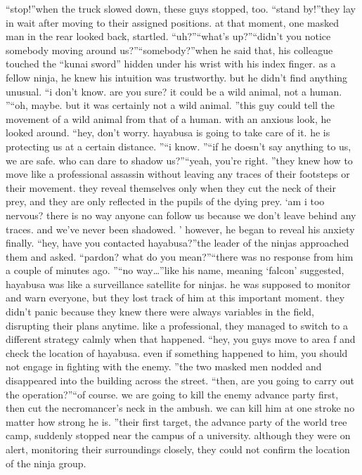 “stop!”when the truck slowed down, these guys stopped, too.
“stand by!”they lay in wait after moving to their assigned positions.
at that moment, one masked man in the rear looked back, startled.
“uh?”“what’s up?”“didn’t you notice somebody moving around us?”“somebody?”when he said that, his colleague touched the “kunai sword” hidden under his wrist with his index finger.
 as a fellow ninja, he knew his intuition was trustworthy.
 but he didn’t find anything unusual.
“i don’t know.
 are you sure? it could be a wild animal, not a human.
”“oh, maybe.
 but it was certainly not a wild animal.
”this guy could tell the movement of a wild animal from that of a human.
with an anxious look, he looked around.
“hey, don’t worry.
 hayabusa is going to take care of it.
 he is protecting us at a certain distance.
”“i know.
”“if he doesn’t say anything to us, we are safe.
 who can dare to shadow us?”“yeah, you’re right.
”they knew how to move like a professional assassin without leaving any traces of their footsteps or their movement.
they reveal themselves only when they cut the neck of their prey, and they are only reflected in the pupils of the dying prey.
‘am i too nervous? there is no way anyone can follow us because we don’t leave behind any traces.
 and we’ve never been shadowed.
’
however, he began to reveal his anxiety finally.
“hey, have you contacted hayabusa?”the leader of the ninjas approached them and asked.
“pardon? what do you mean?”“there was no response from him a couple of minutes ago.
”“no way…”like his name, meaning ‘falcon’ suggested, hayabusa was like a surveillance satellite for ninjas.
he was supposed to monitor and warn everyone, but they lost track of him at this important moment.
they didn’t panic because they knew there were always variables in the field, disrupting their plans anytime.
 like a professional, they managed to switch to a different strategy calmly when that happened.
“hey, you guys move to area f and check the location of hayabusa.
 even if something happened to him, you should not engage in fighting with the enemy.
”the two masked men nodded and disappeared into the building across the street.
“then, are you going to carry out the operation?”“of course.
 we are going to kill the enemy advance party first, then cut the necromancer’s neck in the ambush.
 we can kill him at one stroke no matter how strong he is.
”their first target, the advance party of the world tree camp, suddenly stopped near the campus of a university.
 although they were on alert, monitoring their surroundings closely, they could not confirm the location of the ninja group.
